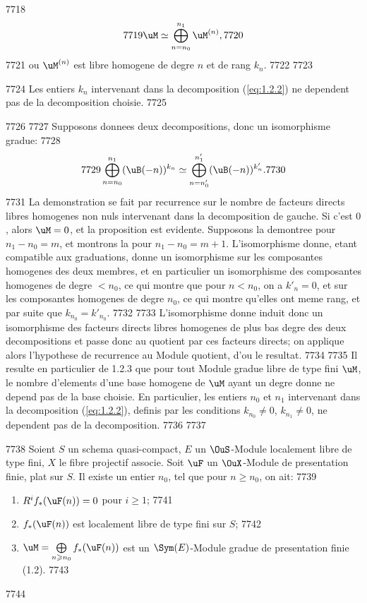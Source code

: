   7718	\[
  7719	\uM \simeq \bigoplus_{n=n_0}^{n_1} \uM^{(n)},
  7720	\]
  7721	ou $\uM^{(n)}$ est libre homogene de degre $n$ et de rang $k_n$.
  7722	
  7723	\begin{prop}
  7724	Les entiers $k_n$ intervenant dans la decomposition (\ref{eq:1.2.2}) ne dependent pas de la decomposition choisie.
  7725	\end{prop}
  7726	
  7727	Supposons donnees deux decompositions, donc un isomorphisme gradue:
  7728	\[
  7729	\bigoplus_{n=n_0}^{n_1} (\uB(-n))^{k_n} \simeq \bigoplus_{n=n'_0}^{n'_1} (\uB(-n))^{k'_n}.
  7730	\]
  7731	La demonstration se fait par recurrence sur le nombre de facteurs directs libres homogenes non nuls intervenant dans la decomposition de gauche. Si c'est $0$, alors $\uM = 0$, et la proposition est evidente. Supposons la demontree pour $n_1 - n_0 = m$, et montrons la pour $n_1 - n_0 = m+1$. L'isomorphisme donne, etant compatible aux graduations, donne un isomorphisme sur les composantes homogenes des deux membres, et en particulier un isomorphisme des composantes homogenes de degre $< n_0$, ce qui montre que pour $n < n_0$, on a $k'_n = 0$, et sur les composantes homogenes de degre $n_0$, ce qui montre qu'elles ont meme rang, et par suite que $k_{n_0} = k'_{n_0}$.
  7732	
  7733	L'isomorphisme donne induit donc un isomorphisme des facteurs directs libres homogenes de plus bas degre des deux decompositions et passe donc au quotient par ces facteurs directs; on applique alors l'hypothese de recurrence au Module quotient, d'ou le resultat.
  7734	
  7735	Il resulte en particulier de 1.2.3 que pour tout Module gradue libre de type fini $\uM$, le nombre d'elements d'une base homogene de $\uM$ ayant un degre donne ne depend pas de la base choisie. En particulier, les entiers $n_0$ et $n_1$ intervenant dans la decomposition (\ref{eq:1.2.2}), definis par les conditions $k_{n_0} \neq 0$, $k_{n_1} \neq 0$, ne dependent pas de la decomposition.
  7736	
  7737	\begin{prop}
  7738	Soient $S$ un schema quasi-compact, $E$ un $\OuS$-Module localement libre de type fini, $X$ le fibre projectif associe. Soit $\uF$ un $\OuX$-Module de presentation finie, plat sur $S$. Il existe un entier $n_0$, tel que pour $n \geqslant n_0$, on ait:
  7739	\begin{enumerate}[label=\roman*)]
  7740	\item $R^i f_*(\uF(n)) = 0$ pour $i \geqslant 1$;
  7741	\item $f_*(\uF(n))$ est localement libre de type fini sur $S$;
  7742	\item $\uM = \bigoplus\limits_{n \geqslant n_0} f_*(\uF(n))$ est un $\Sym(E)$-Module gradue de presentation finie (1.2).
  7743	\end{enumerate}
  7744	\end{prop}
